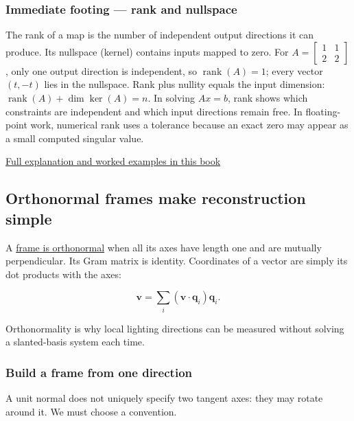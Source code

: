 \subsubsection{Immediate footing --- rank and nullspace}\label{01-foundations-i-ch017-immediate-footing-rank-and-nullspace}

The rank of a map is the number of independent output directions it can produce. Its nullspace (kernel) contains inputs mapped to zero. For \(A=\begin{bmatrix}1&1\\2&2\end{bmatrix}\), only one output direction is independent, so \(\operatorname{rank}(A)=1\); every vector \((t,-t)\) lies in the nullspace. Rank plus nullity equals the input dimension: \(\operatorname{rank}(A)+\dim\ker(A)=n\). In solving \(Ax=b\), rank shows which constraints are independent and which input directions remain free. In floating-point work, numerical rank uses a tolerance because an exact zero may appear as a small computed singular value.

\hyperref[01-foundations-i-ch019-rank-the-four-spaces-and-the-shape-of-the-answer]{Full explanation and worked examples in this book}

\subsection{Orthonormal frames make reconstruction simple}\label{01-foundations-i-ch017-orthonormal-frames-make-reconstruction-simple}

A \hyperref[01-foundations-i-ch017-orthonormal-frames-make-reconstruction-simple]{frame is orthonormal} when all its axes have length one and are mutually perpendicular. Its Gram matrix is identity. Coordinates of a vector are simply its dot products with the axes:

\[
\mathbf v=\sum_i(\mathbf v\cdot\mathbf q_i)\mathbf q_i.
\]

Orthonormality is why local lighting directions can be measured without solving a slanted-basis system each time.

\subsubsection{Build a frame from one direction}\label{01-foundations-i-ch017-build-a-frame-from-one-direction}

A unit normal does not uniquely specify two tangent axes: they may rotate around it. We must choose a convention.

